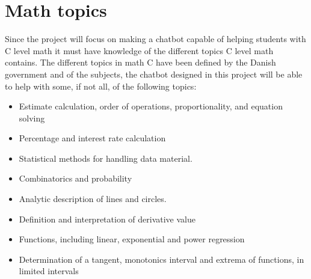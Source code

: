 \section{Math topics}
\label{sec:math_topics}

Since the project will focus on making a chatbot capable of helping students with C level math it must have knowledge of the different topics C level math contains. The different topics in math C have been defined by the Danish government \cite{2017Matematik-C-stx-august-2017} and of the subjects, the chatbot designed in this project will be able to help with some, if not all, of the following topics:

\begin{itemize}
\item Estimate calculation, order of operations, proportionality, and equation solving
\item Percentage and interest rate calculation
\item Statistical methods for handling data material.
\item Combinatorics and probability
\item Analytic description of lines and circles.
\item Definition and interpretation of derivative value
\item Functions, including linear, exponential and power regression
\item Determination of a tangent, monotonics interval and extrema of functions, in limited intervals
\end{itemize}